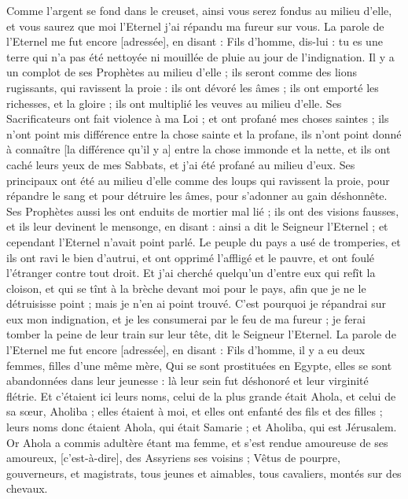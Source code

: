 \begin{multicols}{2}
Comme l'argent se fond dans le creuset, ainsi vous serez fondus au milieu d'elle, et vous saurez que moi l'Eternel j'ai répandu ma fureur sur vous.
La parole de l'Eternel me fut encore [adressée], en disant :
Fils d'homme, dis-lui : tu es une terre qui n'a pas été nettoyée ni mouillée de pluie au jour de l'indignation.
Il y a un complot de ses Prophètes au milieu d'elle ; ils seront comme des lions rugissants, qui ravissent la proie : ils ont dévoré les âmes ; ils ont emporté les richesses, et la gloire ; ils ont multiplié les veuves au milieu d'elle.
Ses Sacrificateurs ont fait violence à ma Loi ; et ont profané mes choses saintes ; ils n'ont point mis différence entre la chose sainte et la profane, ils n'ont point donné à connaître [la différence qu'il y a] entre la chose immonde et la nette, et ils ont caché leurs yeux de mes Sabbats, et j'ai été profané au milieu d'eux.
Ses principaux ont été au milieu d'elle comme des loups qui ravissent la proie, pour répandre le sang et pour détruire les âmes, pour s'adonner au gain déshonnête.
Ses Prophètes aussi les ont enduits de mortier mal lié ; ils ont des visions fausses, et ils leur devinent le mensonge, en disant : ainsi a dit le Seigneur l'Eternel ; et cependant l'Eternel n'avait point parlé.
Le peuple du pays a usé de tromperies, et ils ont ravi le bien d'autrui, et ont opprimé l'affligé et le pauvre, et ont foulé l'étranger contre tout droit.
Et j'ai cherché quelqu'un d'entre eux qui refît la cloison, et qui se tînt à la brèche devant moi pour le pays, afin que je ne le détruisisse point ; mais je n'en ai point trouvé.
C'est pourquoi je répandrai sur eux mon indignation, et je les consumerai par le feu de ma fureur ; je ferai tomber la peine de leur train sur leur tête, dit le Seigneur l'Eternel.
\VerseOne{}La parole de l'Eternel me fut encore [adressée], en disant :
Fils d'homme, il y a eu deux femmes, filles d'une même mère,
Qui se sont prostituées en Egypte, elles se sont abandonnées dans leur jeunesse : là leur sein fut déshonoré et leur virginité flétrie.
Et c'étaient ici leurs noms, celui de la plus grande était Ahola, et celui de sa sœur, Aholiba ; elles étaient à moi, et elles ont enfanté des fils et des filles ; leurs noms donc étaient Ahola, qui était Samarie ; et Aholiba, qui est Jérusalem.
Or Ahola a commis adultère étant ma femme, et s'est rendue amoureuse de ses amoureux, [c'est-à-dire], des Assyriens ses voisins ;
Vêtus de pourpre, gouverneurs, et magistrats, tous jeunes et aimables, tous cavaliers, montés sur des chevaux.

\end{multicols}
